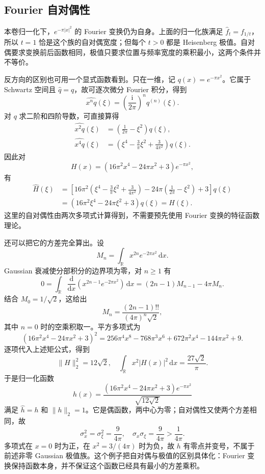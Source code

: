 \subsection{Fourier 自对偶性}
\label{b2:subsec:200203}

本卷归一化下，\(e^{-\pi|x|^2}\) 的 Fourier 变换仍为自身。上面的归一化族满足 \(\widehat f_t=f_{1/t}\)，所以 \(t=1\) 恰是这个族的自对偶宽度；但每个 \(t>0\) 都是 Heisenberg 极值。自对偶要求变换前后函数相同，极值只要求位置与频率宽度的乘积最小，这两个条件并不等价。

反方向的区别也可用一个显式函数看到。只在一维，记 \(q(x)=e^{-\pi x^2}\)。它属于 Schwartz 空间且 \(\widehat q=q\)，故可逐次微分 Fourier 积分，得到
\[
 \widehat{x^nq}(\xi)
 =\left(\frac{\mathrm i}{2\pi}\right)^n q^{(n)}(\xi).
\]
对 \(q\) 求二阶和四阶导数，可直接算得
\[
 \begin{aligned}
 \widehat{x^2q}(\xi)
 &=\left(\frac1{2\pi}-\xi^2\right)q(\xi),\\
 \widehat{x^4q}(\xi)
 &=\left(\xi^4-\frac3\pi\xi^2+\frac3{4\pi^2}\right)q(\xi).
 \end{aligned}
\]
因此对
\[
 H(x)=(16\pi^2x^4-24\pi x^2+3)e^{-\pi x^2},
\]
有
\[
 \begin{aligned}
 \widehat H(\xi)
 &=\left[
 16\pi^2\left(\xi^4-\frac3\pi\xi^2+\frac3{4\pi^2}\right)
 -24\pi\left(\frac1{2\pi}-\xi^2\right)+3
 \right]q(\xi)\\
 &=(16\pi^2\xi^4-24\pi\xi^2+3)q(\xi)=H(\xi).
 \end{aligned}
\]
这里的自对偶性由两次多项式计算得到，不需要预先使用 Fourier 变换的特征函数理论。

还可以把它的方差完全算出。设
\[
 M_n=\int_{\mathbb R}x^{2n}e^{-2\pi x^2}\,\mathrm dx.
\]
Gaussian 衰减使分部积分的边界项为零，对 \(n\geq1\) 有
\[
 0=\int_{\mathbb R}
 \frac{\mathrm d}{\mathrm dx}
 \left(x^{2n-1}e^{-2\pi x^2}\right)\,\mathrm dx
 =(2n-1)M_{n-1}-4\pi M_n.
\]
结合 \(M_0=1/\sqrt2\)，这给出
\[
 M_n=\frac{(2n-1)!!}{(4\pi)^n\sqrt2},
\]
其中 \(n=0\) 时的空乘积取一。平方多项式为
\[
 (16\pi^2x^4-24\pi x^2+3)^2
 =256\pi^4x^8-768\pi^3x^6
   +672\pi^2x^4-144\pi x^2+9.
\]
逐项代入上述矩公式，得到
\[
 \|H\|_2^2=12\sqrt2,
 \quad
 \int_{\mathbb R}x^2|H(x)|^2\,\mathrm dx
 =\frac{27\sqrt2}{\pi}.
\]
于是归一化函数
\begin{equation}\label{b2:eq:20-nongaussian-selfdual}
 h(x)=\frac{(16\pi^2x^4-24\pi x^2+3)e^{-\pi x^2}}
             {\sqrt{12\sqrt2}}
\end{equation}
满足 \(\widehat h=h\) 和 \(\|h\|_2=1\)。它是偶函数，两中心为零；自对偶性又使两个方差相同，故
\[
 \sigma_x^2=\sigma_\xi^2=\frac9{4\pi},
 \quad
 \sigma_x\sigma_\xi=\frac9{4\pi}>\frac1{4\pi}.
\]
多项式在 \(x=0\) 时为正，在 \(x^2=3/(4\pi)\) 时为负，故 \(h\) 有零点并变号，不属于前述非零 Gaussian 极值族。这个例子把自对偶与极值的区别具体化：Fourier 变换保持函数本身，并不保证这个函数已经具有最小的方差乘积。

